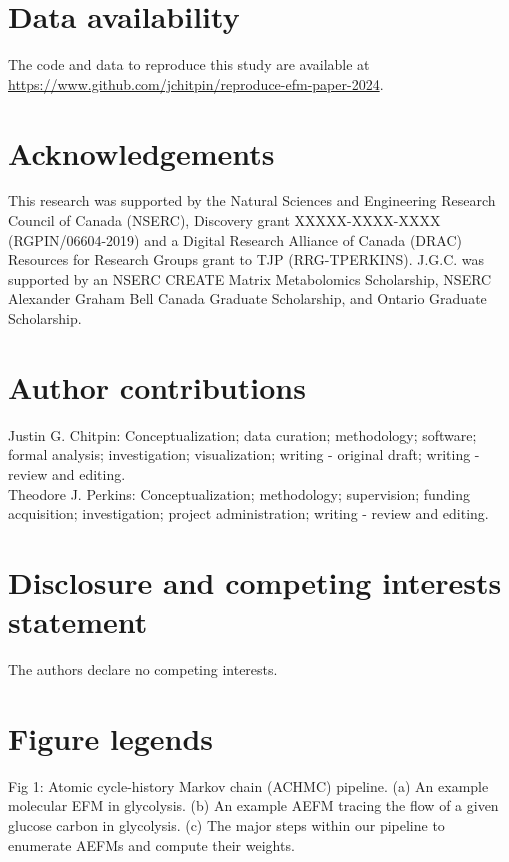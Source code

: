 \documentclass[12pt]{article}
\begin{document}
\section*{Data availability}

The code and data to reproduce this study are available at\\
\url{https://www.github.com/jchitpin/reproduce-efm-paper-2024}.

\section*{Acknowledgements}

This research was supported by the Natural Sciences and Engineering Research Council of Canada (NSERC), Discovery grant XXXXX-XXXX-XXXX (RGPIN/06604-2019) and a Digital Research Alliance of Canada (DRAC) Resources for Research Groups grant to TJP (RRG-TPERKINS). J.G.C. was supported by an NSERC CREATE Matrix Metabolomics Scholarship, NSERC Alexander Graham Bell Canada Graduate Scholarship, and Ontario Graduate Scholarship.

\section*{Author contributions}

Justin G. Chitpin: Conceptualization; data curation; methodology; software; formal analysis; investigation; visualization; writing - original draft; writing - review and editing.\\

\noindent Theodore J. Perkins: Conceptualization; methodology; supervision; funding acquisition; investigation; project administration; writing - review and editing.

\section*{Disclosure and competing interests statement}

The authors declare no competing interests.



\section*{Figure legends}

\noindent Fig 1: Atomic cycle-history Markov chain (ACHMC) pipeline. (a) An
example molecular EFM in glycolysis. (b) An example AEFM tracing the flow
of a given glucose carbon in glycolysis. (c) The major steps within our
pipeline to enumerate AEFMs and compute their weights.
\end{document}
